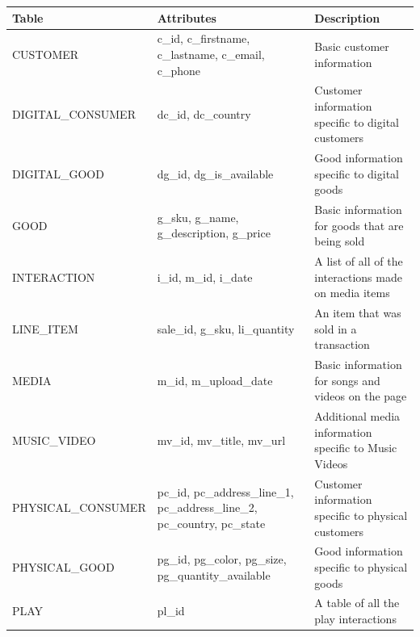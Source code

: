 \documentclass[11pt, a4paper]{report}
\begin{document}
\begin{longtable}{|l|p{4cm}|p{7cm}|}
\hline
\textbf{Table}      & \textbf{Attributes}                                                          & \textbf{Description}                                   \\ \hline
CUSTOMER            & c\_id, c\_firstname, c\_lastname, c\_email, c\_phone                         & Basic customer information                             \\ \hline
DIGITAL\_CONSUMER   & dc\_id, dc\_country                                                          & Customer information specific to digital customers     \\ \hline
DIGITAL\_GOOD       & dg\_id, dg\_is\_available                                                    & Good information specific to digital goods             \\ \hline
GOOD                & g\_sku, g\_name, g\_description, g\_price                                    & Basic information for goods that are being sold        \\ \hline
INTERACTION         & i\_id, m\_id, i\_date                                                        & A list of all of the interactions made on media items  \\ \hline
LINE\_ITEM          & sale\_id, g\_sku, li\_quantity                                               & An item that was sold in a transaction                 \\ \hline
MEDIA               & m\_id, m\_upload\_date                                                       & Basic information for songs and videos on the page     \\ \hline
MUSIC\_VIDEO        & mv\_id, mv\_title, mv\_url                                                   & Additional media information specific to Music Videos  \\ \hline
PHYSICAL\_CONSUMER  & pc\_id, pc\_address\_line\_1, pc\_address\_line\_2, pc\_country, pc\_state   & Customer information specific to physical customers    \\ \hline
PHYSICAL\_GOOD      & pg\_id, pg\_color, pg\_size, pg\_quantity\_available                         & Good information specific to physical goods            \\ \hline
PLAY                & pl\_id                                                                       & A table of all the play interactions                   \\ \hline

\end{longtable}
\end{document}
